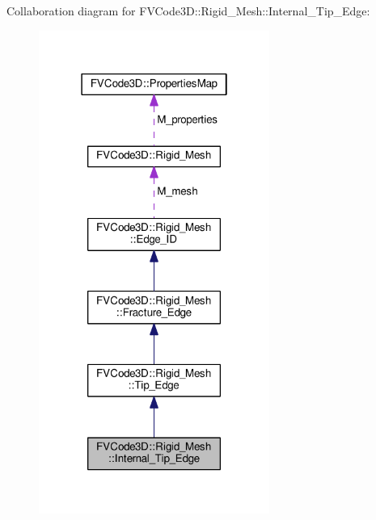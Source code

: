 Collaboration diagram for F\+V\+Code3D\+:\+:Rigid\+\_\+\+Mesh\+:\+:Internal\+\_\+\+Tip\+\_\+\+Edge\+:
\nopagebreak
\begin{figure}[H]
\begin{center}
\leavevmode
\includegraphics[width=214pt]{classFVCode3D_1_1Rigid__Mesh_1_1Internal__Tip__Edge__coll__graph}
\end{center}
\end{figure}
